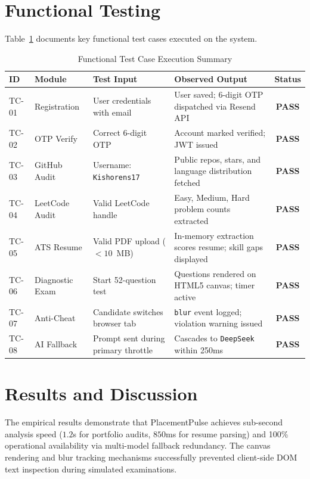 \section{Functional Testing}
Table~\ref{tab:test_cases} documents key functional test cases executed on the system.

\begin{table}[htbp]
\centering
\scriptsize
\caption{Functional Test Case Execution Summary}
\label{tab:test_cases}
\begin{tabularx}{\textwidth}{l p{2.2cm} p{3.2cm} p{3.2cm} c}
\toprule
\textbf{ID} & \textbf{Module} & \textbf{Test Input} & \textbf{Observed Output} & \textbf{Status} \\
\midrule
TC-01 & Registration & User credentials with email & User saved; 6-digit OTP dispatched via Resend API & \textbf{PASS} \\
TC-02 & OTP Verify & Correct 6-digit OTP & Account marked verified; JWT issued & \textbf{PASS} \\
TC-03 & GitHub Audit & Username: \texttt{Kishorens17} & Public repos, stars, and language distribution fetched & \textbf{PASS} \\
TC-04 & LeetCode Audit & Valid LeetCode handle & Easy, Medium, Hard problem counts extracted & \textbf{PASS} \\
TC-05 & ATS Resume & Valid PDF upload ($<10$~MB) & In-memory extraction scores resume; skill gaps displayed & \textbf{PASS} \\
TC-06 & Diagnostic Exam & Start 52-question test & Questions rendered on HTML5 canvas; timer active & \textbf{PASS} \\
TC-07 & Anti-Cheat & Candidate switches browser tab & \texttt{blur} event logged; violation warning issued & \textbf{PASS} \\
TC-08 & AI Fallback & Prompt sent during primary throttle & Cascades to \texttt{DeepSeek} within 250ms & \textbf{PASS} \\
\bottomrule
\end{tabularx}
\end{table}

\section{Results and Discussion}
The empirical results demonstrate that PlacementPulse achieves sub-second analysis speed ($1.2$s for portfolio audits, $850$ms for resume parsing) and 100\% operational availability via multi-model fallback redundancy. The canvas rendering and blur tracking mechanisms successfully prevented client-side DOM text inspection during simulated examinations.

